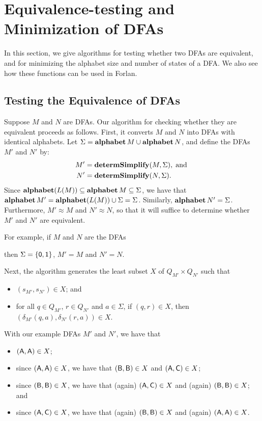 \section{Equivalence-testing and Minimization of DFAs}
\label{EquivalenceTestingAndMinimizationOfDFAs}

In this section, we give algorithms for testing whether two DFAs are
equivalent, and for minimizing the alphabet size and number of states
of a DFA.  We also see how these functions can be used in Forlan.

\subsection{Testing the Equivalence of DFAs}

Suppose $M$ and $N$ are DFAs.  Our algorithm for checking whether they
are equivalent proceeds as follows.  First, it converts $M$ and $N$
into DFAs with identical alphabets.  Let
$\Sigma=\mathbf{alphabet}\,M\cup\mathbf{alphabet}\,N$, and define the DFAs $M'$ and
$N'$ by:
\begin{align*}
M' &= \mathbf{determSimplify}(M,\Sigma) , \;\allowbreak\mbox{and}\allowbreak\;\\
N' &= \mathbf{determSimplify}(N,\Sigma) .
\end{align*}
Since $\mathbf{alphabet}(L(M))\subseteq\mathbf{alphabet}\,M\subseteq\Sigma$, we have that
$\mathbf{alphabet}\,M'=\mathbf{alphabet}(L(M))\cup\Sigma=\Sigma$.  Similarly,
$\mathbf{alphabet}\,N'=\Sigma$.  Furthermore, $M'\approx M$ and $N'\approx N$,
so that it will suffice to determine whether $M'$ and $N'$ are
equivalent.

For example, if $M$ and $N$ are the DFAs
\begin{center}

\end{center}
then $\Sigma=\{\mathsf{0},\mathsf{1}\}$, $M'=M$ and $N'=N$.

Next, the algorithm generates the least subset $X$ of $Q_{M'}\times Q_{N'}$
such that
\begin{itemize}
\item $(s_{M'},s_{N'})\in X$; and

\item for all $q\in Q_{M'}$, $r\in Q_{N'}$ and $a\in\Sigma$,
if $(q,r)\in X$, then $(\delta_{M'}(q,a),\delta_{N'}(r,a))\in X$.
\end{itemize}
With our example DFAs $M'$ and $N'$, we have that
\begin{itemize}
\item $(\mathsf{A},\mathsf{A})\in X$;

\item since $(\mathsf{A},\mathsf{A})\in X$, we have that {$(\mathsf{B},\mathsf{B})\in X$ and
    $(\mathsf{A},\mathsf{C})\in X$;}

\item since $(\mathsf{B},\mathsf{B})\in X$, we have that (again) $(\mathsf{A},\mathsf{C})\in
  X$ and (again) $(\mathsf{B},\mathsf{B})\in X$; and

\item since $(\mathsf{A},\mathsf{C})\in X$, we have that (again) $(\mathsf{B},\mathsf{B})\in
  X$ and (again) $(\mathsf{A},\mathsf{A})\in X$.
\end{itemize}

